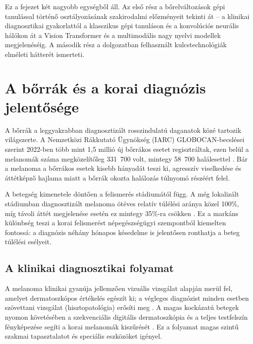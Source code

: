 
Ez a fejezet két nagyobb egységből áll. Az első rész a bőrelváltozások
gépi tanulással történő osztályozásának szakirodalmi előzményeit tekinti át --
a klinikai diagnosztikai gyakorlattól a klasszikus gépi tanuláson és a
konvolúciós neurális hálókon át a Vision Transformer és a multimodális nagy
nyelvi modellek megjelenéséig. A második rész a dolgozatban felhasznált
kulcstechnológiák elméleti hátterét ismerteti.

\section{A bőrrák és a korai diagnózis jelentősége}

A bőrrák a leggyakrabban diagnosztizált rosszindulatú daganatok közé tartozik
világszerte. A Nemzetközi Rákkutató Ügynökség (IARC) GLOBOCAN-becslései szerint
2022-ben több mint 1,5 millió új bőrrákos esetet regisztráltak, ezen belül a
melanomák száma megközelítőleg 331~700 volt, mintegy 58~700 halálesettel
\cite{iarc2022melanoma}. Bár a melanoma a bőrrákos esetek kisebb hányadát teszi
ki, agresszív viselkedése és áttétképző hajlama miatt a bőrrák okozta halálozás
túlnyomó részéért felel.

A betegség kimenetele döntően a felismerés stádiumától függ. A még lokalizált
stádiumban diagnosztizált melanoma ötéves relatív túlélési aránya közel 100\%,
míg távoli áttét megjelenése esetén ez mintegy 35\%-ra csökken
\cite{seer2024melanoma}. Ez a markáns különbség teszi a korai felismerést
népegészségügyi szempontból kiemelten fontossá: a diagnózis néhány hónapos
késedelme is jelentősen ronthatja a beteg túlélési esélyeit.

\subsection{A klinikai diagnosztikai folyamat}

A melanoma klinikai gyanúja jellemzően vizuális vizsgálat alapján merül fel,
amelyet dermatoszkópos értékelés egészít ki; a végleges diagnózist minden
esetben szövettani vizsgálat (hisztopatológia) erősíti meg \cite{garbe2022melanoma}.
A magas kockázatú betegek nyomon követésében a szekvenciális digitális
dermatoszkópia és a teljes testfelszín fényképezése segíti a korai melanomák
kiszűrését \cite{garbe2022melanoma}. Ez a folyamat magas szintű szakmai
tapasztalatot és speciális eszközöket igényel.

